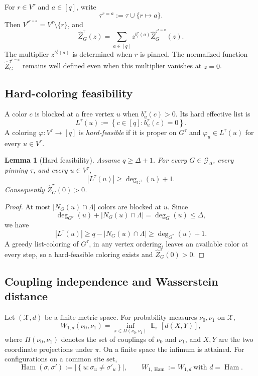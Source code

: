 \documentclass[11pt,reqno]{article}
\theoremstyle{plain}
\newtheorem{lemma}[lemma]{Lemma}
\theoremstyle{definition}
\theoremstyle{remark}
\newcommand{\abs}[1]{\left|#1\right|}
\newcommand{\set}[1]{\left\{#1\right\}}
\DeclareMathOperator{\E}{\mathbb{E}}
\DeclareMathOperator{\Ham}{Ham}
\newcommand{\Deg}{\Delta}                        %
\newcommand{\Wd}{W_{1,d}}                        %
\newcommand{\WHam}{W_{1,\Ham}}                   %
\newcommand{\colours}{[q]}                        %
\newcommand{\bcount}{b}
\newcommand{\Gdeg}{\mathcal{G}_{\Deg}}
\newcommand{\nZpin}[2]{\widehat Z_{#1}^{#2}}
\newcommand{\hardlist}[2]{L^{#1}(#2)}
\begin{document}
For \(r\in V^\tau\) and \(a\in\colours\), write
\[
  \tau^{r=a}:=\tau\cup\{r\mapsto a\}.
\]
Then \(V^{\tau^{r=a}}=V^\tau\setminus\{r\}\), and
\begin{equation}\label{eq:potts-colour-recursion}
  \nZpin{G}{\tau}(z)
  =\sum_{a\in\colours}
     z^{\bcount_r^\tau(a)}\nZpin{G}{\tau^{r=a}}(z).
\end{equation}
The multiplier \(z^{\bcount_r^\tau(a)}\) is determined when \(r\) is pinned.
The normalized function \(\nZpin{G}{\tau^{r=a}}\) remains well defined even
when this multiplier vanishes at \(z=0\).

\subsection{Hard-coloring feasibility}
A color \(c\) is blocked at a free vertex \(u\) when
\(\bcount_u^\tau(c)>0\).  Its hard effective list is
\[
  \hardlist{\tau}{u}:=\set{c\in\colours:\bcount_u^\tau(c)=0}.
\]
A coloring \(\varphi\colon V^\tau\to\colours\) is \emph{hard-feasible}
if it is proper on \(G^\tau\) and
\(\varphi_u\in\hardlist{\tau}{u}\) for every \(u\in V^\tau\).

\begin{lemma}[Hard feasibility]\label{lem:hard-feas}
Assume \(q\ge\Deg+1\).  For every \(G\in\Gdeg\), every pinning \(\tau\),
and every \(u\in V^\tau\),
\[
  \abs{\hardlist{\tau}{u}}
  \ge \deg_{G^\tau}(u)+1.
\]
Consequently \(\nZpin{G}{\tau}(0)>0\).
\end{lemma}

\begin{proof}
At most \(\abs{N_G(u)\cap\Lambda}\) colors are blocked at \(u\).  Since
\[
  \deg_{G^\tau}(u)+\abs{N_G(u)\cap\Lambda}
  =\deg_G(u)\le\Deg,
\]
we have
\[
  \abs{\hardlist{\tau}{u}}
  \ge q-\abs{N_G(u)\cap\Lambda}
  \ge \deg_{G^\tau}(u)+1.
\]
A greedy list-coloring of \(G^\tau\), in any vertex ordering, leaves an
available color at every step, so a hard-feasible coloring exists and
\(\nZpin{G}{\tau}(0)>0\).
\end{proof}

\subsection{Coupling independence and Wasserstein distance}

Let $(\mathcal{X},d)$ be a finite metric space. For probability measures
$\nu_0,\nu_1$ on $\mathcal{X}$,
\begin{equation}\label{eq:W1def}
  \Wd(\nu_0,\nu_1) = \inf_{\pi\in\Pi(\nu_0,\nu_1)} \E_{\pi}[d(X,Y)],
\end{equation}
where $\Pi(\nu_0,\nu_1)$ denotes the set of couplings of $\nu_0$ and
$\nu_1$, and \(X,Y\) are the two coordinate projections under \(\pi\).
On a finite space the infimum is attained.
For configurations on a common site set,
\[
  \Ham(\sigma,\sigma')
    :=\abs{\set{u:\sigma_u\ne\sigma'_u}},
  \qquad
  \WHam:=\Wd\ \text{with }d=\Ham.
\]
\end{document}
